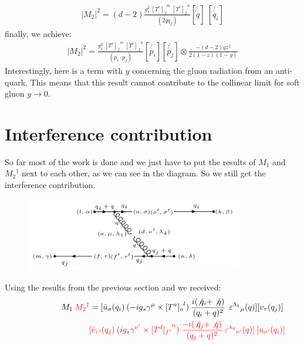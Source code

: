 \begin{equation}
\begin{split}
|M_2|^2 =(d-2) \frac{g_s^2 \: {[T^c]_f}^m \: {[T^c]_{f}}^n }{(2qq_j)} [\not{q}]\: 
[\not{q_i} ]
\end{split}
\end{equation}
finally, we achieve:
\begin{equation}
\begin{split}
|M_2|^2=\frac{g_s^2 \: {[T^c]_f}^m \: {[T^c]_{f}}^n }{(p_i \cdot p_j)}
[\not{p_i}][\not{p_j}]\otimes \frac{-(d-2)yz^2}{2(1-z)(1-y)}
\end{split}
\end{equation}
Interestingly, here is a term with $y$ concerning the gluon radiation from an anti-quark. This means that this result cannot contribute to the collinear limit for soft gluon $ y \rightarrow 0 $.
\newpage

\section{Interference contribution}
So far most of the work is done and we just have to put the results of $M_1$ and ${M_2}^{\dagger}$ next to each other, as we can see in the diagram. So we still get the interference contribution. 
\begin{figure}[h!]
\centering
\includegraphics[width=0.85\textwidth]{images/QQ/M1M2Degaqqg.png}
\end{figure}
Using the results from the previous section and we received:
\begin{equation}
\begin{split}
M_1\:{\color[RGB]{255,0,0} {M_2}^{\dagger}} = [{\bar{u}}_{\sigma}(q_i)\: (-ig_s \gamma^{\mu}\times {[T^a]_o}^l) \: \frac{i(\not{q_i} + \not{q})}{(q_i + q)^2}\:\: {\varepsilon^{\lambda_1}}_{\mu} (q)] [{v}_{\tau}(q_j)]\: \\
\quad\quad\quad\quad\quad\quad\quad\quad\:\:{\color[RGB]{255,0,0}[\bar{v}_{{\tau}^{\prime}}(q_j) \: (ig_s \gamma^{{\nu}^{\prime}}\times {[T^d]_{f^{\prime}}}^n) \: \frac{-i(\not{q_j} + \not{q})}{(q_j + q)^2} \: {\varepsilon^{\lambda_4}}_{{\nu}^{\prime}} (q)]\: [{u}_{{\sigma}^{\prime}}(q_i)]}
\end{split}
\end{equation}

